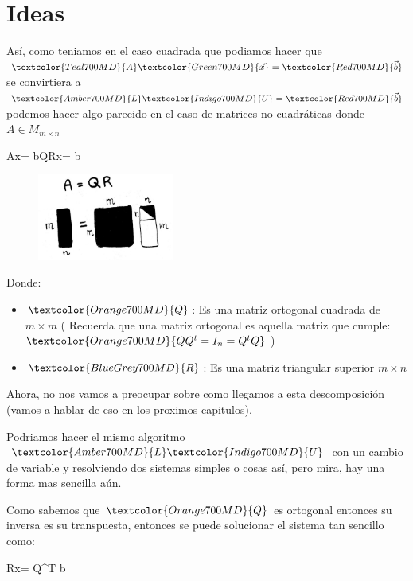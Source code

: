 \documentclass[12pt, fleqn]{report}                             %
\def \Eq {equation}                                             %
\newenvironment{MultiLineEquation*}[1]                          %
        {\begin{\Eq*}\begin{alignedat}{#1}}                         %
        {\end{alignedat}\end{\Eq*}}                                 %
\newenvironment{LargeEq} {\begingroup \Large}{\endgroup}        %
\DeclareMathOperator \Space     {\quad}                         %
\theoremstyle{break}                                            %
\newcommand \lLongTo {\longrightarrow}                          %
\newcommand{\Color}[2]{\textcolor{#1}{#2}}                      %
\newcommand \ColorMatrixA       {Teal700MD}                     %
\newcommand \ColorVecX          {Green700MD}                    %
\newcommand \ColorVecB          {Red700MD}                      %
\newcommand \ColorMatrixL       {Amber700MD}                    %
\newcommand \ColorMatrixU       {Indigo700MD}                   %
\newcommand \ColorMatrixQ       {Orange700MD}                   %
\newcommand \ColorMatrixR       {BlueGrey700MD}                 %
\newcommand \MatrixA      {\Color{\ColorMatrixA}{A}}            %
\newcommand \VecX         {\Color{\ColorVecX}{\vec x}}          %
\newcommand \VecB         {\Color{\ColorVecB}{\vec b}}          %
\newcommand \MatrixL      {\Color{\ColorMatrixL}{L}}            %
\newcommand \MatrixU      {\Color{\ColorMatrixU}{U}}            %
\newcommand \MatrixQ      {\Color{\ColorMatrixQ}{Q}}            %
\newcommand \MatrixR      {\Color{\ColorMatrixR}{R}}            %
\begin{document}
        \section{Ideas}

            Así, como teniamos en el caso cuadrada que podiamos hacer que $\MatrixA \VecX = \VecB$
            se convirtiera a $\MatrixL \MatrixU = \VecB$ podemos hacer algo parecido en el caso
            de matrices no cuadráticas donde $A \in M_{m \times n}$
            \begin{LargeEq}
                \begin{MultiLineEquation*}{3}
                    \MatrixA \VecX = \VecB \Space \lLongTo \Space \MatrixQ \MatrixR \VecX = \VecB               
                \end{MultiLineEquation*}
            \end{LargeEq}
            \begin{figure}[h]
                \includegraphics[width=0.4\textwidth]{AQR}
            \end{figure}

            Donde:
            \begin{itemize}
                \item $\MatrixQ$: Es una matriz ortogonal cuadrada de $m \times m$ 
                    (
                        Recuerda que una matriz ortogonal es aquella matriz que cumple:
                        $\Color{ \ColorMatrixQ }{Q Q^t = I_n = Q^t Q}$    
                    )
                \item $\MatrixR$: Es una matriz triangular superior $m \times n$
            \end{itemize}

            Ahora, no nos vamos a preocupar sobre como llegamos a esta descomposición (vamos a hablar de eso
            en los proximos capitulos).

            Podriamos hacer el mismo algoritmo $\MatrixL \MatrixU$ con un cambio de variable y resolviendo dos
            sistemas simples o cosas así, pero mira, hay una forma mas sencilla aún.

            Como sabemos que $\MatrixQ$ es ortogonal entonces su inversa es su transpuesta, entonces
            se puede solucionar el sistema tan sencillo como:
            \begin{LargeEq}
                \begin{MultiLineEquation*}{3}
                    \MatrixR \VecX = \Color{\ColorMatrixQ}{\MatrixQ^T} \VecB               
                \end{MultiLineEquation*}
            \end{LargeEq}
\end{document}
